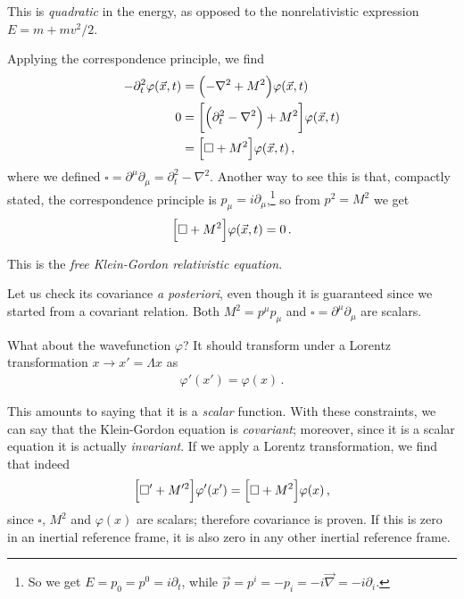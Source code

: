 \documentclass[main.tex]{subfiles}
\begin{document}
This is \emph{quadratic} in the energy, as opposed to the nonrelativistic expression \(E = m + mv^2 /2\). 

Applying the correspondence principle, we find 
%
\begin{subequations}
\begin{align}
- \partial_{t}^2 \varphi (\vec{x}, t) &= \qty(- \nabla^2 + M^2) \varphi (\vec{x}, t)  \\
0 &= \qty[\qty(\partial_{t}^2 - \nabla^2) + M^2] \varphi (\vec{x}, t)   \\
&= \qty[\square + M^2] \varphi (\vec{x}, t)
\,,
\end{align}
\end{subequations}
%
where we defined \(\square = \partial^{\mu } \partial_{\mu } = \partial_{t}^2 - \nabla^2\). 
Another way to see this is that, compactly stated, the correspondence principle is \(p_{\mu } = i  \partial_{\mu }\),\footnote{So we get \(E = p_0 = p^{0} = i \partial_{t}\), while \(\vec{p} = p^{i} = - p_{i} = - i \vec{\nabla} = - i \partial_{i}\).} so from \(p^2= M^2\) we get 
%
\begin{align}
\qty[\square + M^2] \varphi (\vec{x}, t) = 0
\,.
\end{align}

This is the \emph{free Klein-Gordon relativistic equation}. 

Let us check its covariance \emph{a posteriori}, even though it is guaranteed since we started from a covariant relation. 
Both \(M^2 = p^{\mu } p_{\mu }\) and \(\square = \partial^{\mu } \partial_{\mu }\) are scalars.

What about the wavefunction \(\varphi \)?
It should transform under a Lorentz transformation \(x \rightarrow x' = \Lambda x\) as 
%
\begin{align}
\varphi' (x')= \varphi (x)
\,.
\end{align}

This amounts to saying that it is a \emph{scalar} function. 
With these constraints, we can say that the Klein-Gordon equation is \emph{covariant}; moreover, since it is a scalar equation it is actually \emph{invariant}. 
If we apply a Lorentz transformation, we find that indeed 
%
\begin{align}
\qty[\square' + M^{\prime 2} ] \varphi^{\prime } (x^{\prime }) = \qty[\square + M^2] \varphi (x)
\,,
\end{align}
%
since \(\square\), \(M^2\) and \(\varphi (x)\) are scalars; therefore covariance is proven. 
If this is zero in an inertial reference frame, it is also zero in any other inertial reference frame. 
\end{document}
